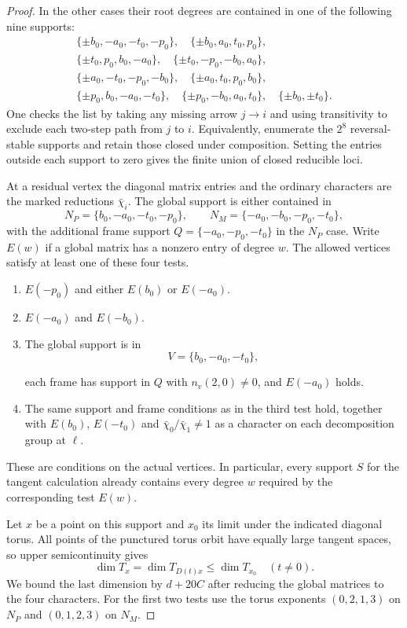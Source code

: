 \begin{proof}
In the other cases their root degrees are
contained in one of the following nine supports:
\[
\begin{gathered}
\{\pm b_0,-a_0,-t_0,-p_0\},\quad
\{\pm b_0,a_0,t_0,p_0\},\\
\{\pm t_0,p_0,b_0,-a_0\},\quad
\{\pm t_0,-p_0,-b_0,a_0\},\\
\{\pm a_0,-t_0,-p_0,-b_0\},\quad
\{\pm a_0,t_0,p_0,b_0\},\\
\{\pm p_0,b_0,-a_0,-t_0\},\quad
\{\pm p_0,-b_0,a_0,t_0\},\quad
\{\pm b_0,\pm t_0\}.
\end{gathered}
\]
One checks the list by taking any missing arrow \(j\to i\)
and using transitivity to exclude each two-step path from
\(j\) to \(i\). Equivalently, enumerate the \(2^8\)
reversal-stable supports and retain those closed under
composition. Setting the entries outside each support to
zero gives the finite union of closed reducible loci.

At a residual vertex the diagonal matrix entries and the
ordinary characters are the marked reductions \(\bar\chi_i\).
The global support is either contained in
\[
 N_P=\{b_0,-a_0,-t_0,-p_0\},\qquad
 N_M=\{-a_0,-b_0,-p_0,-t_0\},
\]
with the additional frame support
\(Q=\{-a_0,-p_0,-t_0\}\) in the \(N_P\) case.
Write \(E(w)\) if a global matrix has a nonzero entry of
degree \(w\). The allowed vertices satisfy at least one of
these four tests.
\begin{enumerate}
\item \(E(-p_0)\) and either \(E(b_0)\) or \(E(-a_0)\).
\item \(E(-a_0)\) and \(E(-b_0)\).
\item The global support is in
\[
 V=\{b_0,-a_0,-t_0\},
\]

      each frame has support in \(Q\) with
      \(n_v(2,0)\ne0\), and \(E(-a_0)\) holds.
\item The same support and frame conditions as in the third
      test hold, together with \(E(b_0)\), \(E(-t_0)\) and
      \(\bar\chi_0/\bar\chi_1\ne1\) as a character on each
      decomposition group at \(\ell\).
\end{enumerate}
These are conditions on the actual vertices. In particular,
every support \(S\) for the tangent calculation already
contains every degree \(w\) required by the corresponding test \(E(w)\).

Let \(x\) be a point on this support and \(x_0\) its limit under the indicated diagonal torus. All points of the punctured torus orbit have equally large tangent spaces, so upper semicontinuity gives
\[
 \dim T_x=\dim T_{D(t)x}\le\dim T_{x_0}\quad(t\ne0).
\]
We bound the last dimension by \(d+20C\) after reducing the global matrices to the four characters. For the first two
tests use the torus exponents \((0,2,1,3)\) on \(N_P\)
and \((0,1,2,3)\) on \(N_M\).


\end{proof}
